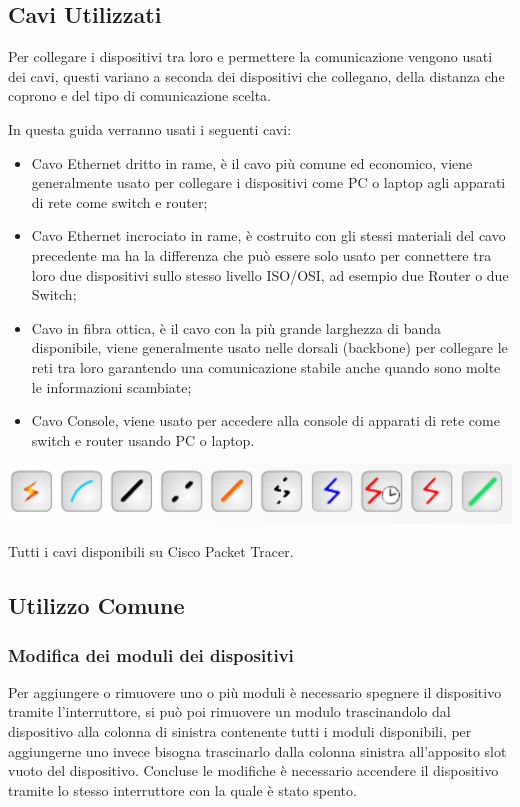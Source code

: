 \subsection{Cavi Utilizzati}
Per collegare i dispositivi tra loro e permettere la comunicazione vengono usati dei cavi, questi variano a seconda dei dispositivi che collegano, della distanza che coprono e del tipo di comunicazione scelta.

\smallskip

\noindent In questa guida verranno usati i seguenti cavi:

\begin{itemize}
    \item Cavo Ethernet dritto in rame, è il cavo più comune ed economico, viene generalmente usato per collegare i dispositivi come PC o laptop agli apparati di rete come switch e router;
    \item Cavo Ethernet incrociato in rame, è costruito con gli stessi materiali del cavo precedente ma ha la differenza che può essere solo usato per connettere tra loro due dispositivi sullo stesso livello ISO/OSI, ad esempio due Router o due Switch;
    \item Cavo in fibra ottica, è il cavo con la più grande larghezza di banda disponibile, viene generalmente usato nelle dorsali (backbone) per collegare le reti tra loro garantendo una comunicazione stabile anche quando sono molte le informazioni scambiate;
    \item Cavo Console, viene usato per accedere alla console di apparati di rete come switch e router usando PC o laptop.
\end{itemize}

\begin{sfigure}
    \centering
    \captionsetup{type=figure}
    \includegraphics[scale=.4]{images/02.packet-tracer/cavi.png}
    \caption{Tutti i cavi disponibili su Cisco Packet Tracer.}
\end{sfigure}

\subsection{Utilizzo Comune}

\subsubsection{Modifica dei moduli dei dispositivi}
Per aggiungere o rimuovere uno o più moduli è necessario spegnere il dispositivo tramite l'interruttore, si può poi rimuovere un modulo trascinandolo dal dispositivo alla colonna di sinistra contenente tutti i moduli disponibili, per aggiungerne uno invece bisogna trascinarlo dalla colonna sinistra all'apposito slot vuoto del dispositivo. Concluse le modifiche è necessario accendere il dispositivo tramite lo stesso interruttore con la quale è stato spento.

